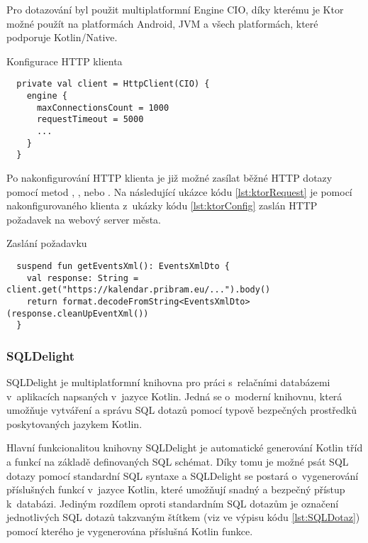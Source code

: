 Pro dotazování byl použit multiplatformní Engine CIO, díky kterému je Ktor možné použít na platformách Android, JVM a všech platformách, které podporuje Kotlin/Native.
\begin{listing}[H]
\caption{Konfigurace HTTP klienta}\label{lst:ktorConfig}
\begin{verbatim}
  private val client = HttpClient(CIO) {
    engine {
      maxConnectionsCount = 1000
      requestTimeout = 5000
      ...
    }
  }
\end{verbatim}
\end{listing}

Po nakonfigurování HTTP klienta je již možné zasílat běžné HTTP dotazy pomocí metod , ,  nebo .
Na následující ukázce kódu \ref{lst:ktorRequest} je pomocí nakonfigurovaného klienta z~ukázky kódu \ref{lst:ktorConfig} zaslán HTTP požadavek
na webový server města.

\begin{listing}[H]
\caption{Zaslání požadavku}\label{lst:ktorRequest}
\begin{verbatim}
  suspend fun getEventsXml(): EventsXmlDto {
    val response: String = client.get("https://kalendar.pribram.eu/...").body()
    return format.decodeFromString<EventsXmlDto>(response.cleanUpEventXml())
  }
\end{verbatim}
\end{listing}

\subsubsection*{SQLDelight}
SQLDelight je multiplatformní knihovna pro práci s~relačními databázemi v~aplikacích napsaných v~jazyce Kotlin. Jedná se o~moderní knihovnu, 
která umožňuje vytváření a správu SQL dotazů pomocí typově bezpečných prostředků poskytovaných jazykem Kotlin.

\medskip

Hlavní funkcionalitou knihovny SQLDelight je automatické generování Kotlin tříd a funkcí na základě definovaných SQL schémat. Díky tomu
je možné psát SQL dotazy pomocí standardní SQL syntaxe a SQLDelight se postará o~vygenerování příslušných funkcí v~jazyce Kotlin, které
umožňují  snadný a bezpečný přístup k~databázi. Jediným rozdílem oproti standardním SQL dotazům je označení jednotlivých SQL dotazů takzvaným 
štítkem (viz  ve výpisu kódu \ref{lst:SQLDotaz}) pomocí kterého je vygenerována příslušná Kotlin funkce. 


